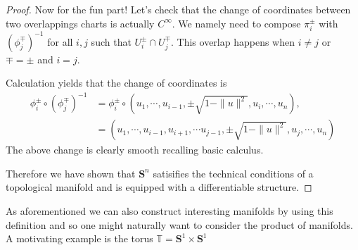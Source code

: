 \documentclass[11pt]{amsart}
\theoremstyle{definition}
\def\sphere{{\pmb S}}
\begin{document}
\begin{proof}
	Now for the fun part! Let's check that the change of coordinates between two overlappings charts is actually $C^\infty.$ We namely need to compose $\pi^{\pm}_i$ with $(\phi_j^{\mp})^{-1}$ for all $i,j$ such that $U_i^\pm \cap U_j^\mp$. This overlap happens when $i \neq j$ or $\mp = \pm$ and $i = j$.

	Calculation yields that the change of coordinates is
	\begin{equation*}
	\begin{aligned}
		\phi_i^{\pm}\circ \left(\phi_j^{\mp}\right)^{-1} &= \phi_i^{\pm}\circ  \left( u_1, \cdots, u_{i-1}, \pm \sqrt{1 - \|u\|^2}, u_i, \cdots, u_n\right),\\
		&= \left( u_1, \cdots,u_{i-1},u_{i+1},\cdots  u_{j-1}, \pm \sqrt{1 - \|u\|^2}, u_j, \cdots, u_n\right)
	\end{aligned}
	\end{equation*}
	The above change is clearly smooth recalling basic calculus.

	Therefore we have shown that $\sphere^n$ satisifies the technical conditions of a topological manifold and is equipped with a differentiable structure.
\end{proof}

As aforementioned we can also construct interesting manifolds by using this definition and so one might naturally want to consider the product of manifolds. A motivating example is the torus $\mathbb{T} = \sphere^1 \times \sphere^1$
\end{document}
